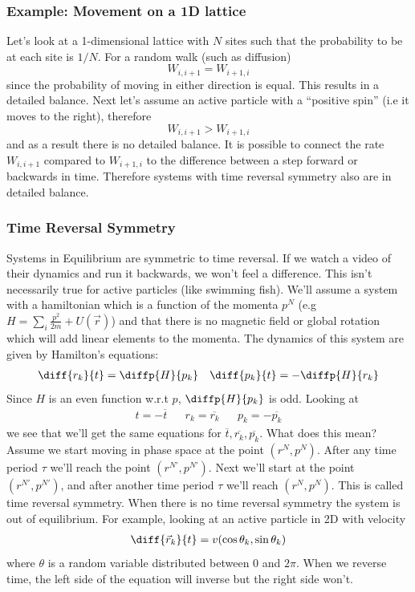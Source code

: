 \subsubsection{Example: Movement on a 1D lattice}
Let's look at a 1-dimensional lattice with \(N\) sites such that the probability to be at each site is \(1/N\). For a random walk (such as diffusion)
\begin{equation}
	W_{i,i+1} = W_{i+1,i}
\end{equation}
since the probability of moving in either direction is equal. This results in a detailed balance. Next let's assume an active particle with a ``positive spin'' (i.e it moves to the right), therefore
\begin{equation}
	W_{i,i+1} > W_{i+1,i}
\end{equation}
and as a result there is no detailed balance. It is possible to connect the rate \(W_{i,i+1}\) compared to \(W_{i+1,i}\) to the difference between a step forward or backwards in time. Therefore systems with time reversal symmetry also are in detailed balance.
\subsubsection{Time Reversal Symmetry}
Systems in Equilibrium are symmetric to time reversal. If we watch a video of their dynamics and run it backwards, we won't feel a difference. This isn't necessarily true for active particles (like swimming fish). We'll assume a system with a hamiltonian which is a function of the momenta \(p^N\) (e.g \(H=\sum\limits_i\frac{p^2}{2m}+U(\vec r)\)) and that there is no magnetic field or global rotation which will add linear elements to the momenta. The dynamics of this system are given by Hamilton's equations:
\begin{align}
	\diff{r_k}{t} = \diffp{H}{p_k} && \diff{p_k}{t} = -\diffp{H}{r_k}
\end{align}
Since \(H\) is an even function w.r.t \(p\), \(\diffp{H}{p_k}\) is odd. Looking at
\begin{align}
	t = -\overline{t} && r_k = \overline{r_k} && p_k = -\overline{p_k}
\end{align}
we see that we'll get the same equations for \(\overline{t}, \overline{r_k}, \overline{p_k}\). What does this mean? Assume we start moving in phase space at the point \((r^N,p^N)\). After any time period \(\tau \) we'll reach the point \((r^{N'},p^{N'})\). Next we'll start at the point \((r^{N'},p^{N'})\), and after another time period \(\tau \) we'll reach \((r^N,p^N)\). This is called time reversal symmetry. When there is no time reversal symmetry the system is out of equilibrium. For example, looking at an active particle in 2D with velocity
\begin{align}
	\diff{\vec r_k}{t} = v(\cos\theta_k,\sin\theta_k)
\end{align}
where \(\theta \) is a random variable distributed between 0 and \(2\pi \). When we reverse time, the left side of the equation will inverse but the right side won't.
\newpage
